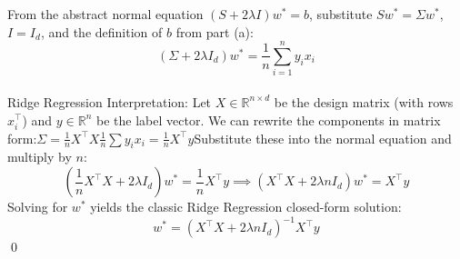 \documentclass{article}
\begin{document}
From the abstract normal equation $(S + 2\lambda I)w^* = b$, substitute $Sw^* = \Sigma w^*$, $I = I_d$, and the definition of $b$ from part (a):$$(\Sigma + 2\lambda I_d)w^* = \frac{1}{n} \sum_{i=1}^n y_i x_i$$
\\
Ridge Regression Interpretation: Let $X \in \mathbb{R}^{n \times d}$ be the design matrix (with rows $x_i^\top$) and $y \in \mathbb{R}^n$ be the label vector. We can rewrite the components in matrix form:$\Sigma = \frac{1}{n}X^\top X$$\frac{1}{n} \sum y_i x_i = \frac{1}{n}X^\top y$Substitute these into the normal equation and multiply by $n$:$$\left(\frac{1}{n}X^\top X + 2\lambda I_d\right)w^* = \frac{1}{n}X^\top y \implies (X^\top X + 2\lambda n I_d)w^* = X^\top y$$Solving for $w^*$ yields the classic Ridge Regression closed-form solution:$$w^* = (X^\top X + 2\lambda n I_d)^{-1} X^\top y$$ \qed
\end{document}
